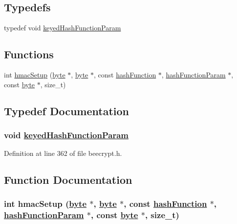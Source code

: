 \subsection*{Typedefs}
\begin{CompactItemize}
\item 
typedef void \hyperlink{group__HMAC__m_ga1}{keyed\-Hash\-Function\-Param}
\end{CompactItemize}
\subsection*{Functions}
\begin{CompactItemize}
\item 
int \hyperlink{group__HMAC__m_ga0}{hmac\-Setup} (\hyperlink{beecrypt_8api_8h_a3}{byte} $\ast$, \hyperlink{beecrypt_8api_8h_a3}{byte} $\ast$, const \hyperlink{structhashFunction}{hash\-Function} $\ast$, \hyperlink{group__HASH__m_ga0}{hash\-Function\-Param} $\ast$, const \hyperlink{beecrypt_8api_8h_a3}{byte} $\ast$, size\_\-t)
\end{CompactItemize}


\subsection{Typedef Documentation}
\hypertarget{group__HMAC__m_ga1}{
\subsubsection[keyedHashFunctionParam]{\setlength{\rightskip}{0pt plus 5cm}void \hyperlink{group__HMAC__m_ga1}{keyed\-Hash\-Function\-Param}}}
\label{group__HMAC__m_ga1}


Definition at line 362 of file beecrypt.h.

\subsection{Function Documentation}
\hypertarget{group__HMAC__m_ga0}{
\subsubsection[hmacSetup]{\setlength{\rightskip}{0pt plus 5cm}int hmac\-Setup (\hyperlink{beecrypt_8api_8h_a3}{byte} $\ast$, \hyperlink{beecrypt_8api_8h_a3}{byte} $\ast$, const \hyperlink{structhashFunction}{hash\-Function} $\ast$, \hyperlink{group__HASH__m_ga0}{hash\-Function\-Param} $\ast$, const \hyperlink{beecrypt_8api_8h_a3}{byte} $\ast$, size\_\-t)}}
\label{group__HMAC__m_ga0}


